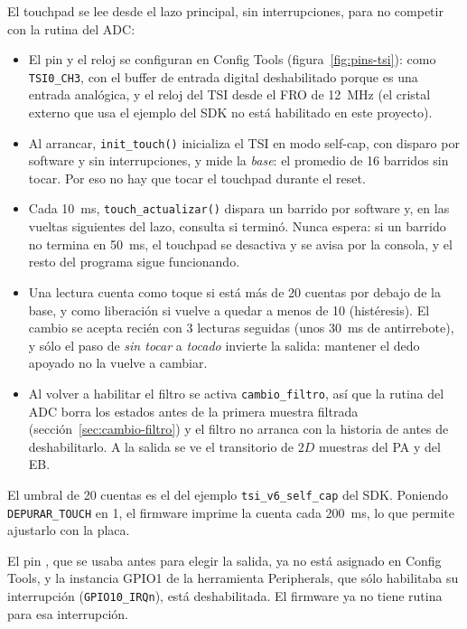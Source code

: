 \documentclass[11pt,a4paper]{article}
\begin{document}
El touchpad se lee desde el lazo principal, sin interrupciones, para no
competir con la rutina del ADC:
\begin{itemize}[nosep]
  \item El pin y el reloj se configuran en Config Tools
        (figura~\ref{fig:pins-tsi}):  como \texttt{TSI0\_CH3}, con
        el buffer de entrada digital deshabilitado porque es una entrada
        analógica, y el reloj del TSI desde el FRO de \qty{12}{\mega\hertz}
        (el cristal externo que usa el ejemplo del SDK no está habilitado en
        este proyecto).
  \item Al arrancar, \texttt{init\_touch()} inicializa el TSI en modo
        self-cap, con disparo por software y sin interrupciones, y mide la
        \emph{base}: el promedio de 16 barridos sin tocar. Por eso no hay que
        tocar el touchpad durante el reset.
  \item Cada \qty{10}{\milli\second}, \texttt{touch\_actualizar()} dispara
        un barrido por software y, en las vueltas siguientes del lazo,
        consulta si terminó. Nunca espera: si un barrido no termina en
        \qty{50}{\milli\second}, el touchpad se desactiva y se avisa por la
        consola, y el resto del programa sigue funcionando.
  \item Una lectura cuenta como toque si está más de 20 cuentas por debajo
        de la base, y como liberación si vuelve a quedar a menos de 10
        (histéresis). El cambio se acepta recién con 3 lecturas seguidas
        (unos \qty{30}{\milli\second} de antirrebote), y sólo el paso de
        \emph{sin tocar} a \emph{tocado} invierte la salida: mantener el
        dedo apoyado no la vuelve a cambiar.
  \item Al volver a habilitar el filtro se activa \texttt{cambio\_filtro},
        así que la rutina del ADC borra los estados antes de la primera
        muestra filtrada (sección~\ref{sec:cambio-filtro}) y el filtro no
        arranca con la historia de antes de deshabilitarlo. A la salida se
        ve el transitorio de $2D$ muestras del PA y del EB.
\end{itemize}
El umbral de 20 cuentas es el del ejemplo \texttt{tsi\_v6\_self\_cap} del
SDK. Poniendo \texttt{DEPURAR\_TOUCH} en 1, el firmware imprime la cuenta
cada \qty{200}{\milli\second}, lo que permite ajustarlo con la placa.

El pin , que se usaba antes para elegir la salida, ya no está
asignado en Config Tools, y la instancia GPIO1 de la herramienta Peripherals,
que sólo habilitaba su interrupción (\texttt{GPIO10\_IRQn}), está
deshabilitada. El firmware ya no tiene rutina para esa interrupción.
\end{document}
